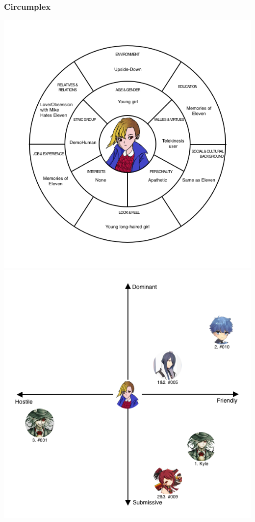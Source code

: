 
\subsubsection{Circumplex}
\begin{center}
	\includegraphics[width=0.76\linewidth]{images/circumplex/bad_eleven_circumplex.png}
	\includegraphics[width=0.76\linewidth]{images/map_of_relations/bad_eleven_map_of_relations.png}
\end{center}

